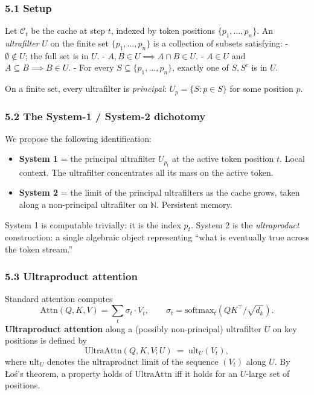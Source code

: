 \documentclass[
  11pt,
]{article}
\providecommand{\tightlist}{%
  \setlength{\itemsep}{0pt}\setlength{\parskip}{0pt}}
\begin{document}
\hypertarget{setup}{%
\subsubsection{5.1 Setup}\label{setup}}

Let \(\mathcal{C}_t\) be the cache at step \(t\), indexed by token
positions \(\{p_1, \dots, p_n\}\). An \emph{ultrafilter} \(U\) on the
finite set \(\{p_1, \dots, p_n\}\) is a collection of subsets
satisfying: - \(\emptyset \notin U\); the full set is in \(U\). -
\(A, B \in U \implies A \cap B \in U\). - \(A \in U\) and
\(A \subseteq B \implies B \in U\). - For every
\(S \subseteq \{p_1,\dots,p_n\}\), exactly one of \(S, S^c\) is in
\(U\).

On a finite set, every ultrafilter is \emph{principal}:
\(U_p = \{S : p \in S\}\) for some position \(p\).

\hypertarget{the-system-1-system-2-dichotomy}{%
\subsubsection{5.2 The System-1 / System-2
dichotomy}\label{the-system-1-system-2-dichotomy}}

We propose the following identification:

\begin{itemize}
\tightlist
\item
  \textbf{System 1} = the principal ultrafilter \(U_{p_t}\) at the
  active token position \(t\). Local context. The ultrafilter
  concentrates all its mass on the active token.
\item
  \textbf{System 2} = the limit of the principal ultrafilters as the
  cache grows, taken along a non-principal ultrafilter on
  \(\mathbb{N}\). Persistent memory.
\end{itemize}

System 1 is computable trivially: it is the index \(p_t\). System 2 is
the \emph{ultraproduct} construction: a single algebraic object
representing ``what is eventually true across the token stream.''

\hypertarget{ultraproduct-attention}{%
\subsubsection{5.3 Ultraproduct
attention}\label{ultraproduct-attention}}

Standard attention computes
\[\mathrm{Attn}(Q, K, V) = \sum_t \sigma_t \cdot V_t, \qquad \sigma_t = \mathrm{softmax}_t(Q K^\top / \sqrt{d_k}).\]
\textbf{Ultraproduct attention} along a (possibly non-principal)
ultrafilter \(U\) on key positions is defined by
\[\mathrm{UltraAttn}(Q, K, V; U) \;=\; \mathrm{ult}_U(V_t),\] where
\(\mathrm{ult}_U\) denotes the ultraproduct limit of the sequence
\((V_t)\) along \(U\). By Łoś's theorem, a property holds of
\(\mathrm{UltraAttn}\) iff it holds for an \(U\)-large set of positions.
\end{document}
